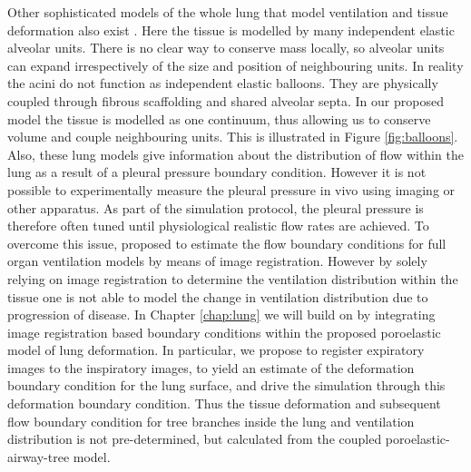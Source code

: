 Other sophisticated models of the whole lung that model ventilation and tissue deformation also exist \cite{ismail2013coupled,Swan2012}. Here the tissue is modelled by many independent elastic alveolar units. There is no clear way to conserve mass locally, so alveolar units can expand irrespectively of the size and position of neighbouring units. In reality the acini do not function as independent elastic balloons. They are physically coupled through fibrous scaffolding and shared alveolar septa. In our proposed model the tissue is modelled as one continuum, thus allowing us to conserve volume and couple neighbouring units. This is illustrated in Figure \ref{fig:balloons}. Also, these lung models \cite{ismail2013coupled,Swan2012} give information about the distribution of flow within the lung as a result of a pleural pressure boundary condition. However it is not possible to experimentally measure the pleural pressure in vivo using imaging or other apparatus. As part of the simulation protocol, the pleural pressure is therefore often tuned until physiological realistic flow rates are achieved. To overcome this issue, \cite{yin2013multiscale,yin2010simulation} proposed to estimate the flow boundary conditions for full organ ventilation models by means of image registration. However by solely relying on image registration to determine the ventilation distribution within the tissue one is not able to model the change in ventilation distribution due to progression of disease. In Chapter \ref{chap:lung} we will build on \cite{yin2010simulation} by integrating image registration based boundary conditions within the proposed poroelastic model of lung deformation. In particular, we propose to register expiratory images to the inspiratory images, to yield an estimate of the deformation boundary condition for the lung surface, and drive the simulation through this deformation boundary condition. Thus the tissue deformation and subsequent flow boundary condition for tree branches inside the lung and ventilation distribution is not pre-determined, but calculated from the coupled poroelastic-airway-tree model.

